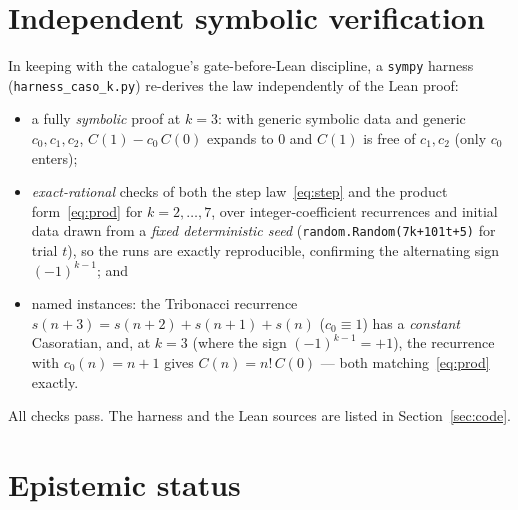 \documentclass[11pt]{article}
\newcommand{\Caso}{C}
\begin{document}
\section{Independent symbolic verification}\label{sec:gate}

In keeping with the catalogue's gate-before-Lean discipline, a \texttt{sympy} harness
(\texttt{harness\_caso\_k.py}) re-derives the law independently of the Lean proof:
\begin{itemize}
\item a fully \emph{symbolic} proof at $k=3$: with generic symbolic data and generic
$c_0,c_1,c_2$, $\Caso(1)-c_0\,\Caso(0)$ expands to $0$ and $\Caso(1)$ is
free of $c_1,c_2$ (only $c_0$ enters);
\item \emph{exact-rational} checks of both the step law~\eqref{eq:step} and the
product form~\eqref{eq:prod} for $k=2,\dots,7$, over integer-coefficient recurrences
and initial data drawn from a \emph{fixed deterministic seed}
(\texttt{random.Random(7k+101t+5)} for trial $t$), so the runs are exactly
reproducible, confirming the alternating sign $(-1)^{k-1}$; and
\item named instances: the Tribonacci recurrence $s(n+3)=s(n+2)+s(n+1)+s(n)$ ($c_0\equiv1$)
has a \emph{constant} Casoratian, and, at $k=3$ (where the sign $(-1)^{k-1}=+1$), the
recurrence with $c_0(n)=n+1$ gives $\Caso(n)=n!\,\Caso(0)$ --- both
matching~\eqref{eq:prod} exactly.
\end{itemize}
All checks pass. The harness and the Lean sources are listed in
Section~\ref{sec:code}.

\section{Epistemic status}\label{sec:status}
\end{document}
